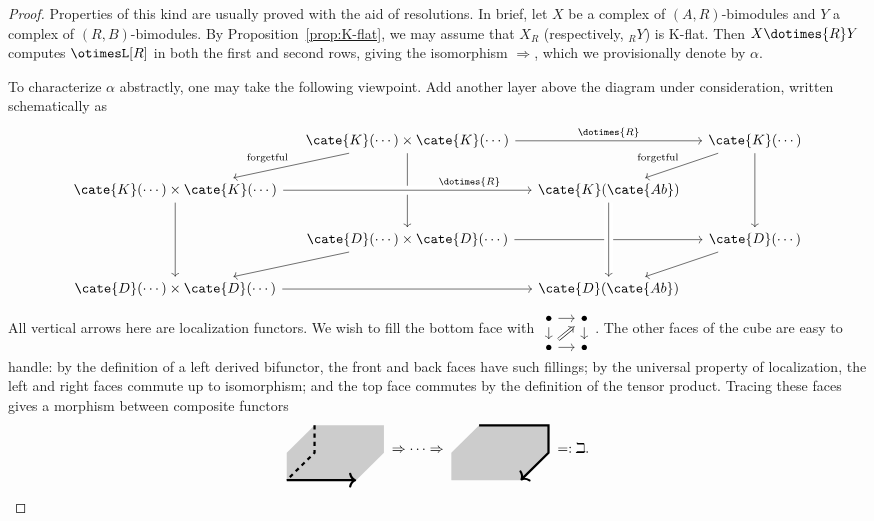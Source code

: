 \begin{proof}
	Properties of this kind are usually proved with the aid of resolutions. In
	brief, let $X$ be a complex of $(A,R)$-bimodules and $Y$ a complex of
	$(R,B)$-bimodules. By Proposition~\ref{prop:K-flat}, we may assume that
	$X_R$ (respectively, ${}_RY$) is K-flat. Then $X\dotimes{R}Y$ computes
	$\otimesL[R]$ in both the first and second rows, giving the isomorphism
	$\Rightarrow$, which we provisionally denote by $\alpha$.

	To characterize $\alpha$ abstractly, one may take the following viewpoint.
	Add another layer above the diagram under consideration, written
	schematically as
	\[\begin{tikzcd}[column sep=small]
		& \cate{K}(\cdots) \times \cate{K}(\cdots) \arrow[dd] \arrow[ld, "\text{forgetful}"'] \arrow[rr, "\dotimes{R}"] & & \cate{K}(\cdots) \arrow[dd] \arrow[ld, "\text{forgetful}"'] \\
		\cate{K}(\cdots) \times \cate{K}(\cdots) \arrow[rr, crossing over, "\dotimes{R}" near end] \arrow[dd] & & \cate{K}(\cate{Ab}) & \\
		& \cate{D}(\cdots) \times \cate{D}(\cdots) \arrow[rr] \arrow[ld] & & \cate{D}(\cdots) \arrow[ld] \\
		\cate{D}(\cdots) \times \cate{D}(\cdots) \arrow[rr] & & \cate{D}(\cate{Ab}) \arrow[leftarrow, uu, crossing over] &
	\end{tikzcd}\]
	All vertical arrows here are localization functors. We wish to fill the
	bottom face with
	$\begin{tikzcd}[row sep=small, column sep=small]
		\bullet \arrow[r] \arrow[d] & \bullet \arrow[d] \\
		\bullet \arrow[r] \arrow[Rightarrow, ru] & \bullet
	\end{tikzcd}$.
	The other faces of the cube are easy to handle: by the definition of a left
	derived bifunctor, the front and back faces have such fillings; by the
	universal property of localization, the left and right faces commute up to
	isomorphism; and the top face commutes by the definition of the tensor
	product. Tracing these faces gives a morphism between composite functors
	\[\begin{tikzpicture}[baseline, scale=0.7]
		\fill[gray!40] (0, 1) -- (-1, 0) -- (-1, -1) -- (1.5, -1) --(2.5, 0) -- (2.5, 1)  --cycle;
		\draw[ultra thick, dashed] (0,1) -- (0,0) -- (-1, -1);
		\draw[ultra thick, ->] (-1, -1) -- (1.5, -1);
	\end{tikzpicture} \;\Rightarrow \cdots \Rightarrow\; \begin{tikzpicture}[baseline, scale=0.7]
		\fill[gray!40] (-1, 1) -- (1.5, 1) -- (1.5, 0) -- (0.5, -1) -- (-2, -1) -- (-2, 0) --cycle;
		\draw[ultra thick, ->] (-1,1) -- (1.5 , 1) -- (1.5, 0)  -- (0.5, -1);
	\end{tikzpicture} \; =: \beth. \]


\end{proof}
